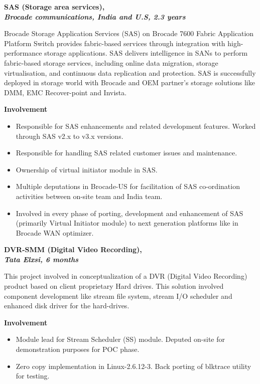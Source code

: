 \documentclass[a4paper,10pt]{memoir} %
\newcommand{\SmallSep}{\vspace{0.5em}} %
\newcommand{\CVItem}[2]{ %
\textbf{\color{RoyalBlue} #1}\par
#2
\SmallSep %
}
\begin{document}
\CVItem{SAS (Storage area services), \\
\textit{Brocade communications, India and U.S, 2.3 years}} {
Brocade Storage Application Services (SAS) on Brocade 7600 Fabric Application Platform Switch provides fabric-based services through integration with high-performance storage applications. SAS delivers intelligence in SANs to perform fabric-based storage services, including online data migration, storage virtualisation, and continuous data replication and protection. SAS is successfully deployed in storage world with Brocade and OEM partner’s storage solutions like DMM, EMC Recover-point and Invista. 

\textbf{Involvement}
\begin{itemize}
\item Responsible for SAS enhancements and related development features. Worked through SAS v2.x to v3.x versions. 
\item Responsible for handling SAS related customer issues and maintenance. 
\item Ownership of virtual initiator module in SAS. 
\item Multiple deputations in Brocade-US for facilitation of SAS co-ordination activities between on-site team and India team.
\item Involved in every phase of porting, development and enhancement of SAS (primarily Virtual Initiator module) to next generation platforms like in Brocade WAN optimizer.  
\end{itemize}
\hrulefill
}

\CVItem{DVR-SMM (Digital Video Recording), \\
\textit{Tata Elxsi, 6 months}} {
This project involved in conceptualization of a DVR (Digital Video Recording) product based on client proprietary Hard drives. This solution involved component development like stream file system, stream I/O scheduler and enhanced disk driver for the hard-drives. 

\textbf{Involvement}
\begin{itemize}
\item Module lead for Stream Scheduler (SS) module. Deputed on-site for demonstration purposes for POC phase.
\item Zero copy implementation in Linux-2.6.12-3. Back porting of blktrace utility for testing.
\end{itemize}
\hrulefill
}
\end{document}
